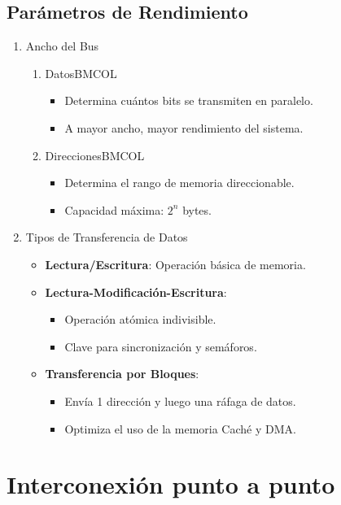 \documentclass[presentation]{beamer}
\begin{document}
\subsection{Parámetros de Rendimiento}
\label{sec:orge8bcd0f}
\begin{enumerate}
\item Ancho del Bus
\label{sec:org6b68084}
\begin{enumerate}
\item Datos\hfill{}\textsc{BMCOL}
\label{sec:org77aed46}
\begin{itemize}
\item Determina cuántos bits se transmiten en paralelo.
\item A mayor ancho, mayor rendimiento del sistema.
\end{itemize}
\item Direcciones\hfill{}\textsc{BMCOL}
\label{sec:org18845a1}
\begin{itemize}
\item Determina el rango de memoria direccionable.
\item Capacidad máxima: \(2^{n}\) bytes.
\end{itemize}
\end{enumerate}

\item Tipos de Transferencia de Datos
\label{sec:orgf1ae6b9}
\begin{itemize}
\item \textbf{Lectura/Escritura}: Operación básica de memoria.
\item \textbf{Lectura-Modificación-Escritura}: 
\begin{itemize}
\item Operación atómica indivisible.
\item Clave para sincronización y semáforos.
\end{itemize}
\item \textbf{Transferencia por Bloques}:
\begin{itemize}
\item Envía 1 dirección y luego una ráfaga de datos.
\item Optimiza el uso de la memoria Caché y DMA.
\end{itemize}
\end{itemize}
\end{enumerate}

\section{Interconexión punto a punto}
\label{sec:orgcb8bd89}
\end{document}

